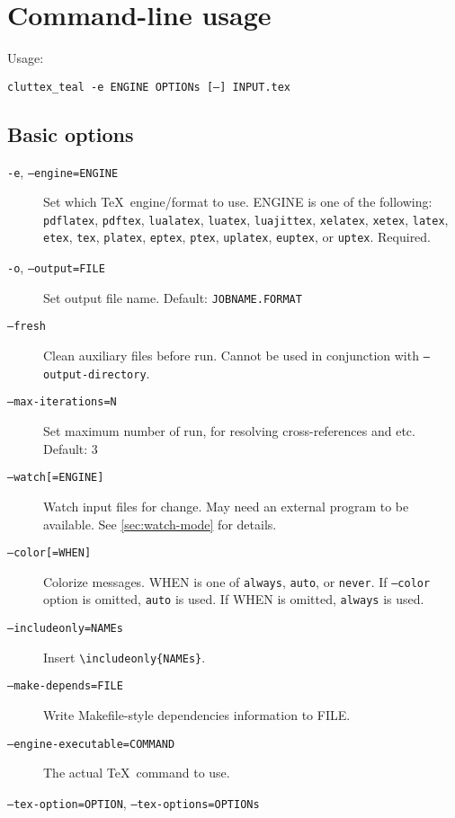 \documentclass[a4paper]{report}
\newcommand\texcmd[1]{\texttt{\textbackslash #1}}
\newcommand\metavar[1]{\textnormal{\textsf{#1}}}
\begin{document}
\section{Command-line usage}
Usage:
\begin{center}
  \texttt{cluttex\_teal -e \metavar{ENGINE} \metavar{OPTIONs} [--] \metavar{INPUT}.tex}
\end{center}

\subsection{Basic options}
\begin{description}
\item[\texttt{-e}, \texttt{--engine=\metavar{ENGINE}}]
  Set which \TeX\ engine/format to use.
  \metavar{ENGINE} is one of the following:
  \texttt{pdflatex}, \texttt{pdftex},
  \texttt{lualatex}, \texttt{luatex}, \texttt{luajittex},
  \texttt{xelatex}, \texttt{xetex},
  \texttt{latex}, \texttt{etex}, \texttt{tex},
  \texttt{platex}, \texttt{eptex}, \texttt{ptex},
  \texttt{uplatex}, \texttt{euptex}, or \texttt{uptex}.
  Required.
\item[\texttt{-o}, \texttt{--output=\metavar{FILE}}]
  Set output file name.
  Default: \texttt{\metavar{JOBNAME}.\metavar{FORMAT}}
\item[\texttt{--fresh}]
  Clean auxiliary files before run.
  Cannot be used in conjunction with \texttt{--output-directory}.
\item[\texttt{--max-iterations=\metavar{N}}]
  Set maximum number of run, for resolving cross-references and etc.
  Default: 3
\item[\texttt{--watch[=\metavar{ENGINE}]}]
  Watch input files for change.
  May need an external program to be available.
  See \autoref{sec:watch-mode} for details.
\item[\texttt{--color[=\metavar{WHEN}]}]
  Colorize messages.
  \metavar{WHEN} is one of \texttt{always}, \texttt{auto}, or \texttt{never}.
  If \texttt{--color} option is omitted, \texttt{auto} is used.
  If \metavar{WHEN} is omitted, \texttt{always} is used.
\item[\texttt{--includeonly=\metavar{NAMEs}}]
  Insert \texttt{\texcmd{includeonly}\{\metavar{NAMEs}\}}.
\item[\texttt{--make-depends=\metavar{FILE}}]
  Write Makefile-style dependencies information to \metavar{FILE}.
\item[\texttt{--engine-executable=\metavar{COMMAND}}]
  The actual \TeX\ command to use.
\item[\texttt{--tex-option=\metavar{OPTION}}, \texttt{--tex-options=\metavar{OPTIONs}}]

\end{description}
\end{document}
